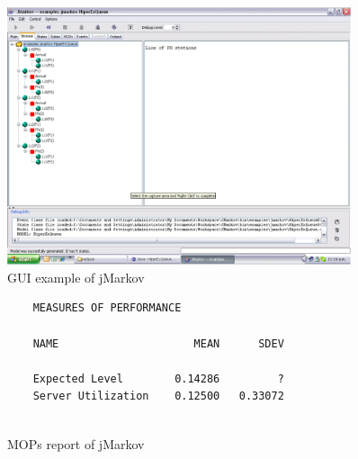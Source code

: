 \documentclass[11pt,letterpaper]{article}
\begin{document}
\begin{figure}[bt]
  \centering
  \includegraphics[width=0.9\textwidth,clip]{pics/GUIexampleQBD}
  \caption{GUI example of jMarkov}\label{fg:GUIExample}
\end{figure}

\begin{figure}[htb]
  \small
  \begin{lstlisting}
    MEASURES OF PERFORMANCE
    
    NAME                     MEAN      SDEV
    
    Expected Level        0.14286         ?
    Server Utilization    0.12500   0.33072
    
  \end{lstlisting}
  \caption{MOPs report of jMarkov}\label{fg:MOPs}
\end{figure}






\end{document}
